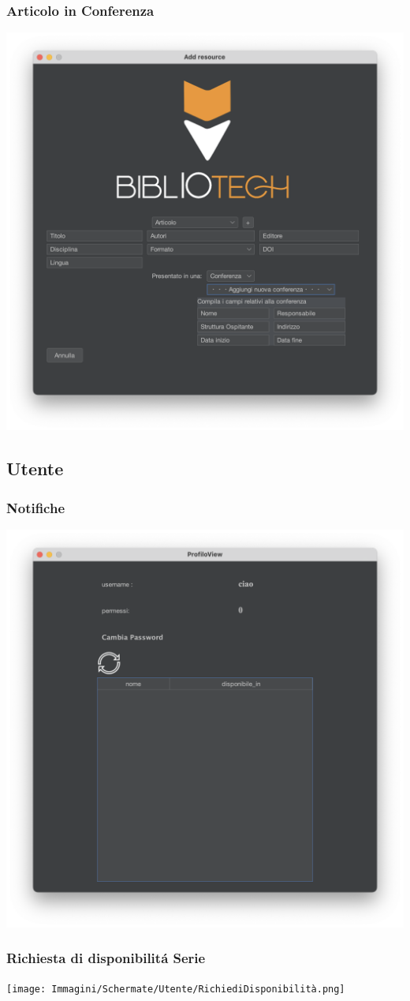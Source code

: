 \subsubsection{Articolo in Conferenza}
\includegraphics[scale=0.25]{Immagini/Schermate/Insert/InserisciRisorsaPage-ArticoliConferenza.png}

\subsection{Utente}
\subsubsection{Notifiche}
\includegraphics[scale=0.25]{Immagini/Schermate/Utente/NotificheUtente.png}
\subsubsection{Richiesta di disponibilit\'a Serie}
\texttt{[image: Immagini/Schermate/Utente/RichiediDisponibilità.png]}

